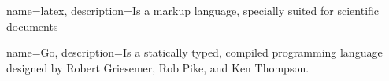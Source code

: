 
 {
    name=latex,
    description={Is a markup language, specially suited for scientific documents}
}

 {
    name=Go,
    description={Is a statically typed, compiled programming language designed by Robert Griesemer, Rob Pike, and Ken Thompson.}
}
